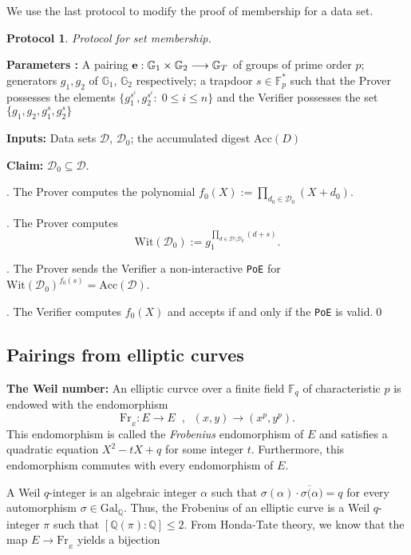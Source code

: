 \documentclass[11pt, lettersize, notitlepage, leqno, footskip=0.6cm]{article}
\newcommand{\bF}{\mathbb F}
\newcommand{\bq}{\mathbb Q}
\newcommand{\bFp}{\mathbb{F}_p}
\newcommand{\absq}{\mathrm{Gal}_{\bq}}
\newcommand{\lra}{\longrightarrow}
\newcommand{\mc}{\mathcal}
\newcommand{\mb}{\mathbb}
\newcommand{\mr}{\mathrm}
\newcommand{\al}{\alpha}
\newcommand{\ov}{\overline}
\newcommand{\sub}{\subseteq}
\newcommand{\vs}{\vspace{-0.15cm}}
\newcommand{\noin}{\noindent}
\newtheorem{Prot}[Thm]{Protocol}
\numberwithin{equation}{section}
\begin{document}
\noin We use the last protocol to modify the proof of membership for a data set.

\begin{Prot} Protocol for set membership.\end{Prot} \vspace{-0.3cm}

\noindent \textbf{Parameters :} A pairing ${\bf{e}}: \mb{G}_1\times \mb{G}_2\lra \mb{G}_T$ of groups of prime order $p$; generators $g_1, g_2$ of $\mb{G}_1$, $\mb{G}_2$ respectively; a trapdoor $s\in \bFp^*$ such that the Prover possesses the elements $\{g_1^{s^i}, g_2^{s^i}:\; 0\leq i\leq n \}$ and the Verifier possesses the set $\{g_1, g_2, g_1^s, g_2^s \}$ 

\noindent \textbf{Inputs:} Data sets $\mc{D}$, $\mc{D}_0$; the accumulated digest $\mr{Acc}(D)$

\noindent \textbf{Claim:} $\mc{D}_0\sub \mc{D}$.\vspace{0.1cm}

\normalfont \noin 1. The Prover computes the polynomial $f_0(X):= \prod\limits_{d_0\in \mc{D}_0}(X+d_0)$.

. The Prover computes $$\mr{Wit}(\mc{D}_0) := g_1^{\prod\limits_{d\in \mc{D}\setminus \mc{D}_0} (d+s)}.$$

. The Prover sends the Verifier a non-interactive \verb|PoE| for $\mr{Wit}(\mc{D}_0)^{f_0(s)} = \mr{Acc}(\mc{D})$.

. The Verifier computes $f_0(X)$ and accepts if and only if the \verb|PoE| is valid.\qed \\


\subsection{\fontsize{11}{11}\selectfont Pairings from elliptic curves}



\noin \textbf{The Weil number:} An elliptic curvce over a finite field $\bF _q$ of characteristic $p$ is endowed with the endomorphism \vs $$\mr{Fr}_{_E} : E\lra E\;\;,\;\;(x,y)\lra (x^p, y^p) .$$ This endomorphism is called the \textit{Frobenius} endomorphism of $E$ and satisfies a quadratic equation $X^2 - tX + q$ for some integer $t$. Furthermore, this endomorphism commutes with every endomorphism of $E$.

A Weil $q$-integer is an algebraic integer $\al$ such that $\sigma(\al)\cdot \ov{\sigma(\al}) = q$ for every automorphism $\sigma\in \absq$. Thus, the Frobenius of an elliptic curve is a Weil $q$-integer $\pi$ such that $[\bq(\pi):\bq]\leq 2$. From Honda-Tate theory, we know that the map $E\lra \mr{Fr}_{_E}$ yields a bijection \vspace{-3mm}
\end{document}
